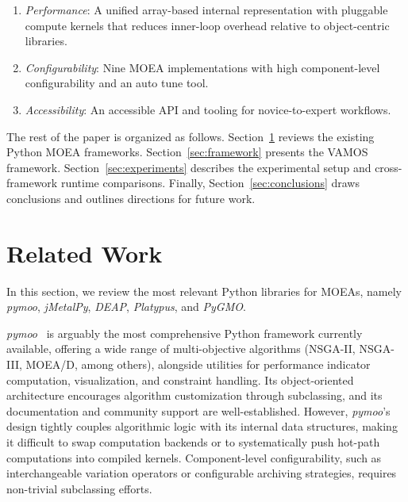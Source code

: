 \documentclass[journal]{IEEEtran}
\begin{document}
\begin{enumerate}[label=\alph*)]

  \item \textit{Performance}: A unified array-based internal representation with pluggable compute kernels that reduces inner-loop overhead relative to object-centric libraries.

  \item \textit{Configurability}: Nine MOEA implementations with high component-level configurability and an auto tune tool.
  
  \item \textit{Accessibility}: An accessible API and tooling for novice-to-expert workflows.
  
\end{enumerate}

The rest of the paper is organized as follows. Section~\ref{sec:related} reviews the existing Python MOEA frameworks. Section~\ref{sec:framework} presents the VAMOS framework. Section~\ref{sec:experiments} describes the experimental setup and cross-framework runtime comparisons. Finally, Section~\ref{sec:conclusions} draws conclusions and outlines directions for future work.

\section{Related Work} \label{sec:related}

In this section, we review the most relevant Python libraries for MOEAs, namely \textit{pymoo}, \textit{jMetalPy}, \textit{DEAP}, \textit{Platypus}, and \textit{PyGMO}.

\textit{pymoo}~\cite{BD20}  is arguably the most comprehensive Python framework currently available, offering a wide range of multi-objective algorithms (NSGA-II, NSGA-III, MOEA/D, among others), alongside utilities for performance indicator computation, visualization, and constraint handling. Its object-oriented architecture encourages algorithm customization through subclassing, and its documentation and community support are well-established. However, \textit{pymoo}'s design tightly couples algorithmic logic with its internal data structures, making it difficult to swap computation backends or to systematically push hot-path computations into compiled kernels. Component-level configurability, such as interchangeable variation operators or configurable archiving strategies, requires non-trivial subclassing efforts.
\end{document}
